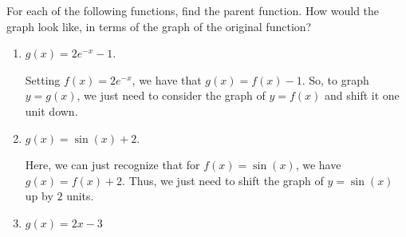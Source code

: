 \documentclass[handout, noauthor, nooutcomes]{ximera}
\begin{document}
\begin{example}
  For each of the following functions, find the parent function. How would the graph look like, in terms of the graph of the original function?
  \begin{enumerate}[label=\alph*.]
  \item $g(x) = 2e^{-x} - 1$. \\[.5em]
    \begin{explanation}
      Setting $f(x) = 2e^{-x}$, we have that $g(x) = f(x)-1$. So, to graph $y=g(x)$, we just need to consider the graph of $y=f(x)$ and shift it one unit down.
      \begin{image}
      \end{image}
    \end{explanation}
  \item $g(x) = \sin(x) + 2$. \\[.5em]
    \begin{explanation}
      Here, we can just recognize that for $f(x) = \sin(x)$, we have $g(x) = f(x)+2$. Thus, we just need to shift the graph of $y=\sin(x)$ up by $2$ units.
      \begin{image}
      \end{image}
    \end{explanation}
  \item $g(x) = 2x-3$ \\[.5em]
    \begin{explanation}

\end{explanation}
\end{enumerate}
\end{example}
\end{document}
